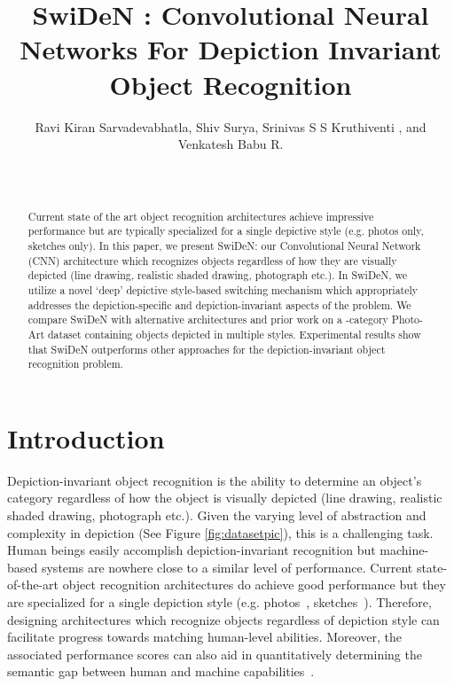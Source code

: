 \documentclass[preprint]{sig-alternate-05-2015}
\begin{document}
\title{SwiDeN : Convolutional Neural Networks For Depiction Invariant Object Recognition}

\author{\alignauthor Ravi Kiran Sarvadevabhatla, Shiv Surya, Srinivas S S Kruthiventi , and\\ Venkatesh Babu R. \\
 \\  \\
}

\maketitle
\begin{abstract}
Current state of the art object  recognition architectures achieve impressive performance but are typically specialized for a single depictive style (e.g. photos only, sketches only). In this paper, we present SwiDeN: our Convolutional Neural Network (CNN) architecture which recognizes objects regardless of how they are visually depicted (line drawing, realistic shaded drawing, photograph etc.). In SwiDeN, we utilize a novel `deep' depictive style-based switching mechanism which appropriately addresses the depiction-specific and depiction-invariant aspects of the problem. We compare SwiDeN with  alternative architectures and prior work on a -category Photo-Art dataset containing objects depicted in multiple styles. Experimental results show that SwiDeN outperforms other approaches for the depiction-invariant object recognition problem. 
\end{abstract}

\section{Introduction}

Depiction-invariant object recognition is the ability to determine an object's category regardless of how the object is visually depicted (line drawing, realistic shaded drawing, photograph etc.). Given the varying level of abstraction and complexity in depiction (See Figure \ref{fig:datasetpic}), this is a challenging task. Human beings easily accomplish depiction-invariant recognition but machine-based systems are nowhere close to a similar level of performance. Current state-of-the-art object recognition architectures do achieve good performance but they are specialized for a single depiction style (e.g. photos~\cite{he2015deep}, sketches~\cite{yang2015deep}). Therefore,  designing architectures which recognize objects regardless of depiction style can facilitate progress towards matching human-level abilities. Moreover, the associated performance scores can also aid in quantitatively determining the semantic gap between human and machine capabilities~\cite{Ullman08032016}. 
\end{document}
